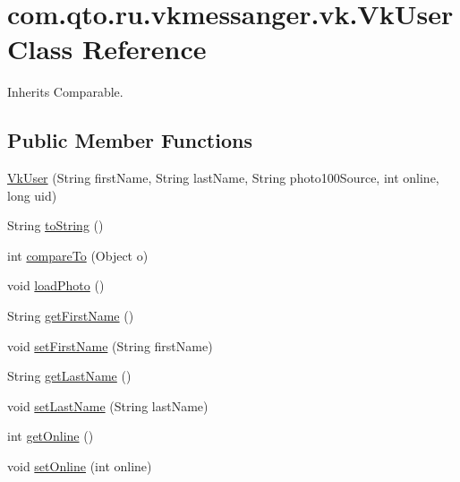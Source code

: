 \hypertarget{classcom_1_1qto_1_1ru_1_1vkmessanger_1_1vk_1_1_vk_user}{}\section{com.\+qto.\+ru.\+vkmessanger.\+vk.\+Vk\+User Class Reference}
\label{classcom_1_1qto_1_1ru_1_1vkmessanger_1_1vk_1_1_vk_user}


Inherits Comparable.

\subsection*{Public Member Functions}
\begin{DoxyCompactItemize}
\item 
\hyperlink{classcom_1_1qto_1_1ru_1_1vkmessanger_1_1vk_1_1_vk_user_a318664d43f1990779574e4096d011164}{Vk\+User} (String first\+Name, String last\+Name, String photo100\+Source, int online, long uid)
\item 
String \hyperlink{classcom_1_1qto_1_1ru_1_1vkmessanger_1_1vk_1_1_vk_user_a3ff9320423e2588bd3998bfde5e89a00}{to\+String} ()
\item 
int \hyperlink{classcom_1_1qto_1_1ru_1_1vkmessanger_1_1vk_1_1_vk_user_aba645bc0684e8bf37e27c579e016f806}{compare\+To} (Object o)
\item 
void \hyperlink{classcom_1_1qto_1_1ru_1_1vkmessanger_1_1vk_1_1_vk_user_a02ca5614dd8d29ae631b4d2e29bcfdcf}{load\+Photo} ()
\item 
String \hyperlink{classcom_1_1qto_1_1ru_1_1vkmessanger_1_1vk_1_1_vk_user_a2852eed452b3ff15939dc15d5693b8ce}{get\+First\+Name} ()
\item 
void \hyperlink{classcom_1_1qto_1_1ru_1_1vkmessanger_1_1vk_1_1_vk_user_aaa47495c66f567b96f2f5cc8deeb4f3b}{set\+First\+Name} (String first\+Name)
\item 
String \hyperlink{classcom_1_1qto_1_1ru_1_1vkmessanger_1_1vk_1_1_vk_user_a464554edfdce64d31821a62d5de07266}{get\+Last\+Name} ()
\item 
void \hyperlink{classcom_1_1qto_1_1ru_1_1vkmessanger_1_1vk_1_1_vk_user_a5a0781cda25e5f349e3af70465e24c46}{set\+Last\+Name} (String last\+Name)
\item 
int \hyperlink{classcom_1_1qto_1_1ru_1_1vkmessanger_1_1vk_1_1_vk_user_aaf6afe7011cd0e598b08cf95c3e51ff6}{get\+Online} ()
\item 
void \hyperlink{classcom_1_1qto_1_1ru_1_1vkmessanger_1_1vk_1_1_vk_user_a1c872c375d4e54dd67c860bdbe50a504}{set\+Online} (int online)

\end{DoxyCompactItemize}
